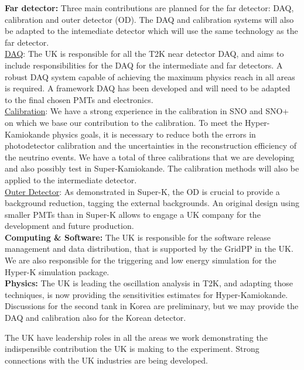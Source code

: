 \documentclass[11pt]{article}
\begin{document}
{\bf Far detector:} Three main contributions are planned for the far
detector: DAQ, calibration and outer detector (OD). The DAQ and
calibration systems will also be adapted to the intemediate detector
which will use the same technology as the far detector.\\

{\underline{DAQ}:} The UK is responsible for all the T2K near detector
DAQ, and aims to include responsibilities for the DAQ for the
intermediate and far detectors. A robust DAQ system capable of
achieving the maximum physics reach in all areas is required. A
framework DAQ has been developed and will need to be adapted to the
final chosen PMTs and electronics.\\

{\underline{Calibration}:} We have a strong experience in the
calibration in SNO and SNO+ on which we base our contribution to the
calibration. To meet the Hyper-Kamiokande physics goals, it is
necessary to reduce both the errors in photodetector calibration and
the uncertainties in the reconstruction efficiency of the neutrino
events. We have a total of three calibrations that we are developing
and also possibly test in Super-Kamiokande. The calibration methods
will also be applied to the intermediate detector.\\

{\underline{Outer Detector}:} As demonstrated in Super-K, the OD is
crucial to provide a background reduction, tagging the external
backgrounds. An original design using smaller PMTs than in Super-K
allows to engage a UK company for the development and future
production.\\

{\bf Computing \& Software:} The UK is responsible for the software
release management and data distribution, that is supported by the
GridPP in the UK. We are also responsible for the triggering and low
energy simulation for the Hyper-K simulation package.\\

{\bf Physics:} The UK is leading the oscillation analysis in T2K, and
adapting those techniques, is now providing the sensitivities
estimates for Hyper-Kamiokande.\\

Discussions for the second tank in Korea are preliminary, but we may
provide the DAQ and calibration also for the Korean detector.

The UK have leadership roles in all the areas we work demonstrating
the indispensible contribution the UK is making to the
experiment. Strong connections with the UK industries are being
developed.
\end{document}
